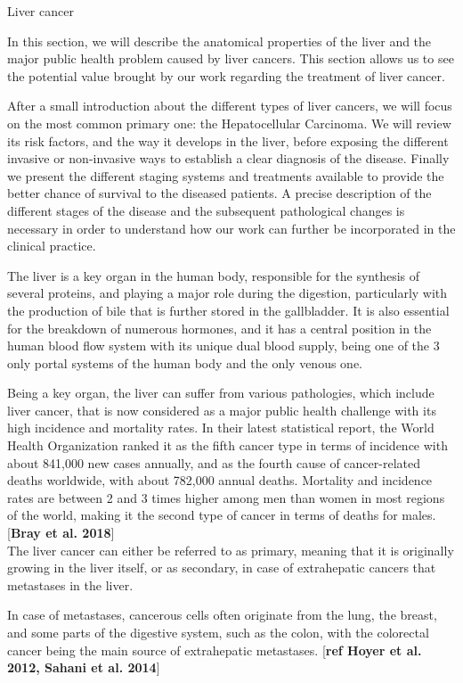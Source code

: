 \documentclass[]{article}
\date{}
\begin{document}
\protect\hypertarget{anchor}{}{}Liver cancer

In this section, we will describe the anatomical properties of the liver
and the major public health problem caused by liver cancers. This
section allows us to see the potential value brought by our work
regarding the treatment of liver cancer.

After a small introduction about the different types of liver cancers,
we will focus on the most common primary one: the Hepatocellular
Carcinoma. We will review its risk factors, and the way it develops in
the liver, before exposing the different invasive or non-invasive ways
to establish a clear diagnosis of the disease. Finally we present the
different staging systems and treatments available to provide the better
chance of survival to the diseased patients. A precise description of
the different stages of the disease and the subsequent pathological
changes is necessary in order to understand how our work can further be
incorporated in the clinical practice.

The liver is a key organ in the human body, responsible for the
synthesis of several proteins, and playing a major role during the
digestion, particularly with the production of bile that is further
stored in the gallbladder. It is also essential for the breakdown of
numerous hormones, and it has a central position in the human blood flow
system with its unique dual blood supply, being one of the 3 only portal
systems of the human body and the only venous one.

Being a key organ, the liver can suffer from various pathologies, which
include liver cancer, that is now considered as a major public health
challenge with its high incidence and mortality rates. In their latest
statistical report, the World Health Organization ranked it as the fifth
cancer type in terms of incidence with about 841,000 new cases annually,
and as the fourth cause of cancer-related deaths worldwide, with about
782,000 annual deaths. Mortality and incidence rates are between 2 and 3
times higher among men than women in most regions of the world, making
it the second type of cancer in terms of deaths for males.
{[}\textbf{Bray et al. 2018}{]}\\

The liver cancer can either be referred to as primary, meaning that it
is originally growing in the liver itself, or as secondary, in case of
extrahepatic cancers that metastases in the liver.

In case of metastases, cancerous cells often originate from the lung,
the breast, and some parts of the digestive system, such as the colon,
with the colorectal cancer being the main source of extrahepatic
metastases. {[}\textbf{ref Hoyer et al. 2012, Sahani et al. 2014}{]}
\end{document}
